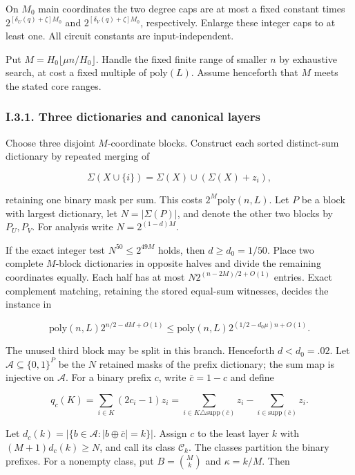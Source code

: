 On \(M_0\) main coordinates the two degree caps are at most a fixed constant times \(2^{[\delta_U(q)+\zeta]M_0}\) and \(2^{[\delta_V(q)+\zeta]M_0}\), respectively. Enlarge these integer caps to at least one. All circuit constants are input-independent.

Put \(M=H_0\lfloor\mu n/H_0\rfloor\). Handle the fixed finite range of smaller \(n\) by exhaustive search, at cost a fixed multiple of \(\mathrm{poly}(L)\). Assume henceforth that \(M\) meets the stated core ranges.

\hypertarget{af-a9ec399514-i.3.1.-three-dictionaries-and-canonical-layers}{%
\subsubsection{I.3.1. Three dictionaries and canonical layers}\label{af-a9ec399514-i.3.1.-three-dictionaries-and-canonical-layers}}

Choose three disjoint \(M\)-coordinate blocks. Construct each sorted distinct-sum dictionary by repeated merging of

\[
\Sigma(X\cup\{i\})=\Sigma(X)\cup(\Sigma(X)+z_i),
\]

retaining one binary mask per sum. This costs \(2^M\mathrm{poly}(n,L)\). Let \(P\) be a block with largest dictionary, let \(N=|\Sigma(P)|\), and denote the other two blocks by \(P_U,P_V\). For analysis write \(N=2^{(1-d)M}\).

If the exact integer test \(N^{50}\le2^{49M}\) holds, then \(d\ge d_0=1/50\). Place two complete \(M\)-block dictionaries in opposite halves and divide the remaining coordinates equally. Each half has at most \(N2^{(n-2M)/2+O(1)}\) entries. Exact complement matching, retaining the stored equal-sum witnesses, decides the instance in

\[
\mathrm{poly}(n,L)2^{n/2-dM+O(1)}
\le\mathrm{poly}(n,L)2^{(1/2-d_0\mu)n+O(1)}.
\tag{71}
\]

The unused third block may be split in this branch. Henceforth \(d<d_0=.02\). Let \(\mathcal A\subseteq\{0,1\}^P\) be the \(N\) retained masks of the prefix dictionary; the sum map is injective on \(\mathcal A\). For a binary prefix \(c\), write \(\bar c=1-c\) and define

\[
q_c(K)=\sum_{i\in K}(2c_i-1)z_i
=\sum_{i\in K\triangle\mathrm{supp}(\bar c)}z_i
-\sum_{i\in\mathrm{supp}(\bar c)}z_i.
\tag{72}
\]

Let \(d_c(k)=|\{b\in\mathcal A:|b\oplus\bar c|=k\}|\). Assign \(c\) to the least layer \(k\) with \((M+1)d_c(k)\ge N\), and call its class \(\mathcal C_k\). The classes partition the binary prefixes. For a nonempty class, put \(B=\binom Mk\) and \(\kappa=k/M\). Then

